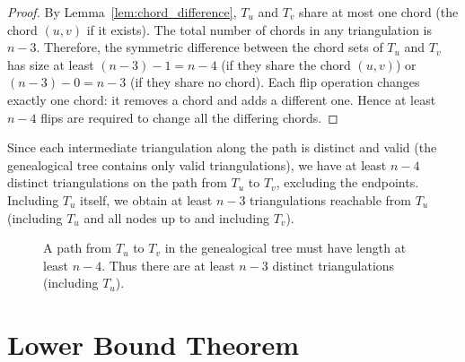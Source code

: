 \begin{proof}
    By Lemma~\ref{lem:chord_difference}, \(T_u\) and \(T_v\) share at most one chord (the chord \((u, v)\) if it exists). 
    The total number of chords in any triangulation is \(n-3\). 
    Therefore, the symmetric difference between the chord sets of \(T_u\) and \(T_v\) has size at least \((n-3)-1 = n-4\) (if they share the chord \((u, v)\)) or \((n-3)-0 = n-3\) (if they share no chord). 
    Each flip operation changes exactly one chord: it removes a chord and adds a different one. 
    Hence at least \(n-4\) flips are required to change all the differing chords.
\end{proof}

Since each intermediate triangulation along the path is distinct and valid (the genealogical tree contains only valid triangulations), we have at least \(n-4\) distinct triangulations on the path from \(T_u\) to \(T_v\), excluding the endpoints. 
Including \(T_u\) itself, we obtain at least \(n-3\) triangulations reachable from \(T_u\) (including \(T_u\) and all nodes up to and including \(T_v\)).

\begin{figure}[htbp]
    \centering
    \caption{A path from \(T_u\) to \(T_v\) in the genealogical tree must have length at least \(n-4\). 
    Thus there are at least \(n-3\) distinct triangulations (including \(T_u\)).}
    \label{fig:path_length}
\end{figure}

\section{Lower Bound Theorem}
\label{sec:lower_bound_theorem}

